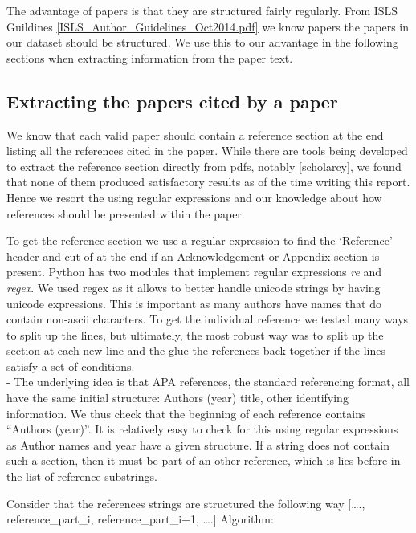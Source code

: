 \documentclass[journal,twocolumn]{IEEEtran}
\begin{document}
The advantage of papers is that they are structured fairly regularly.
From ISLS Guildines \ref{ISLS_Author_Guidelines_Oct2014.pdf} we know
papers the papers in our dataset should be structured. We use this to
our advantage in the following sections when extracting information from
the paper text.

\hypertarget{extracting-the-papers-cited-by-a-paper}{%
\subsection{Extracting the papers cited by a
paper}\label{extracting-the-papers-cited-by-a-paper}}

We know that each valid paper should contain a reference section at the
end listing all the references cited in the paper. While there are tools
being developed to extract the reference section directly from pdfs,
notably {[}scholarcy{]}, we found that none of them produced
satisfactory results as of the time writing this report. Hence we resort
the using regular expressions and our knowledge about how references
should be presented within the paper.

To get the reference section we use a regular expression to find the
`Reference' header and cut of at the end if an Acknowledgement or
Appendix section is present. Python has two modules that implement
regular expressions \emph{re} and \emph{regex}. We used regex as it
allows to better handle unicode strings by having unicode expressions.
This is important as many authors have names that do contain non-ascii
characters. To get the individual reference we tested many ways to split
up the lines, but ultimately, the most robust way was to split up the
section at each new line and the glue the references back together if
the lines satisfy a set of conditions.\\
- The underlying idea is that APA references, the standard referencing
format, all have the same initial structure: Authors (year) title, other
identifying information. We thus check that the beginning of each
reference contains ``Authors (year)''. It is relatively easy to check
for this using regular expressions as Author names and year have a given
structure. If a string does not contain such a section, then it must be
part of an other reference, which is lies before in the list of
reference substrings.

Consider that the references strings are structured the following way
{[}\ldots{}., reference\_part\_i, reference\_part\_i+1, \ldots{}.{]}
Algorithm:
\end{document}
